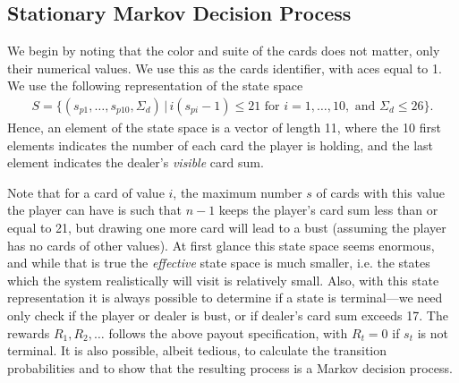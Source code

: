 \subsection*{Stationary Markov Decision Process}
We begin by noting that the color and suite of the cards does not matter, only their numerical values. We use this as the cards identifier, with aces equal to 1. We use the following representation of the state space
\begin{align*}
	S = \{  (s_{p1},\ldots,s_{p10},\Sigma_{d}) \, | \, i (s_{pi} - 1) \leq 21 \text { for }i=1,\ldots,10, \text{ and } \Sigma_{d} \leq 26 \}.
\end{align*}
Hence, an element of the state space is a vector of length 11, where the 10 first elements indicates the number of each card the player is holding, 
and the last element indicates the dealer's \emph{visible} card sum.

Note that for a card of value $i$, the maximum number $s$ of cards with this value the player can have is such that $n-1$ keeps the player's card sum less than or equal to 21,
but drawing one more card will lead to a bust (assuming the player has no cards of other values). At first glance this state space seems enormous, 
and while that is true the \textit{effective} state space is much smaller, i.e. the states which the system realistically will visit is relatively small.  
Also, with this state representation it is always possible to determine if a state is terminal---we need only check if the player or dealer is bust, or if dealer's card sum 
exceeds 17. The rewards $R_1,R_2,\ldots$ follows the above payout specification, with $R_t = 0$ if $s_t$ is not terminal.
It is also possible, albeit tedious, to calculate the transition probabilities and to show that the resulting process is a Markov decision process.

